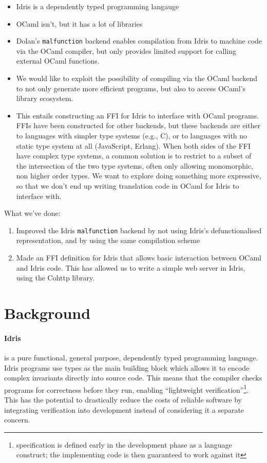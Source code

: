 \documentclass[a4paper,11pt,twocolumn]{article}
\newcommand{\malfunction}{\texttt{malfunction}}
\begin{document}
\begin{itemize}
\item Idris is a dependently typed programming langauge
\item OCaml isn't, but it has a lot of libraries
\item Dolan's \texttt{malfunction} backend enables compilation from
  Idris to machine code via the OCaml compiler, but only provides
  limited support for calling external OCaml functions.
\item We would like to exploit the possibility of compiling via the
  OCaml backend to not only generate more efficient programs, but also
  to access OCaml's library ecosystem.
\item This entails constructing an FFI for Idris to interface with
  OCaml programs. FFIs have been constructed for other backends, but
  these backends are either to languages with simpler type systems
  (e.g., C), or to languages with no static type system at all
  (JavaScript, Erlang). When both sides of the FFI have complex type
  systems, a common solution is to restrict to a subset of the
  intersection of the two type systems, often only allowing
  monomorphic, non higher order types. We want to explore doing
  something more expressive, so that we don't end up writing
  translation code in OCaml for Idris to interface with.
\end{itemize}

What we've done:
\begin{enumerate}
\item Improved the Idris \malfunction{} backend by not using Idris's
  defunctionalised representation, and by using the same compilation
  scheme
\item Made an FFI definition for Idris that allows basic interaction
  between OCaml and Idris code. This has allowed us to write a simple
  web server in Idris, using the Cohttp library.
\end{enumerate}

\section{Background}

\paragraph{Idris} %
is a pure functional,
general purpose, dependently typed programming language.
Idris programs use types as the main building block which allows it
to encode complex invariants directly into source code.
This means that the compiler checks programs for
correctness before they run, enabling
``lightweight verification''\footnote{specification is
	defined early in the development phase as a language construct;
	the implementing code is then guaranteed to work against it}.
This has the potential to drastically reduce the costs
of reliable software by integrating verification into development
instead of considering it a separate concern.
\end{document}
